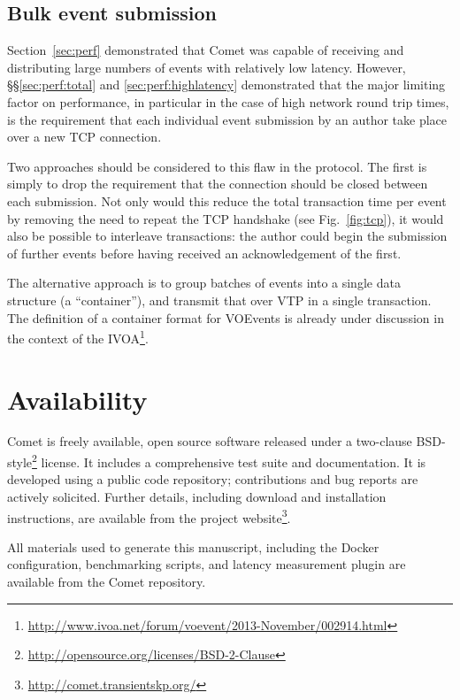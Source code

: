 \documentclass[5p,authoryear]{elsarticle}
\begin{document}
\subsection{Bulk event submission}
\label{sec:future:bulk}

Section~\ref{sec:perf} demonstrated that Comet was capable of receiving and
distributing large numbers of events with relatively low latency. However,
\S\S\ref{sec:perf:total} and \ref{sec:perf:highlatency} demonstrated that
the major limiting factor on performance, in particular in the case of high
network round trip times, is the requirement that each individual event
submission by an author take place over a new TCP connection.

Two approaches should be considered to this flaw in the protocol. The first is
simply to drop the requirement that the connection should be closed between
each submission. Not only would this reduce the total transaction time per
event by removing the need to repeat the TCP handshake (see
Fig.~\ref{fig:tcp}), it would also be possible to interleave transactions: the
author could begin the submission of further events before having received an
acknowledgement of the first.

The alternative approach is to group batches of events into a single data
structure (a ``container''), and transmit that over VTP in a single
transaction. The definition of a container format for VOEvents is already
under discussion in the context of the
IVOA\footnote{\url{http://www.ivoa.net/forum/voevent/2013-November/002914.html}}.

\section{Availability}
\label{sec:avail}

Comet is freely available, open source software released under a two-clause
BSD-style\footnote{\url{http://opensource.org/licenses/BSD-2-Clause}} license.
It includes a comprehensive test suite and documentation. It is developed
using a public code repository; contributions and bug reports are actively
solicited.  Further details, including download and installation instructions,
are available from the project
website\footnote{\url{http://comet.transientskp.org/}}.

All materials used to generate this manuscript, including the Docker
configuration, benchmarking scripts, and latency measurement plugin are
available from the Comet repository.
\end{document}
